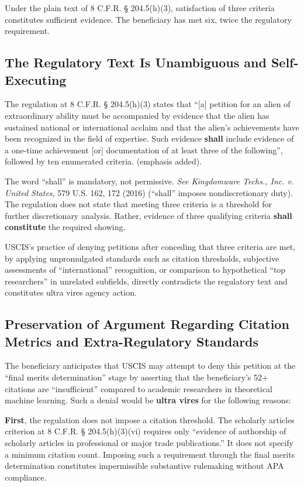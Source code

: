 Under the plain text of 8 C.F.R. § 204.5(h)(3), satisfaction of three criteria constitutes sufficient evidence. The beneficiary has met six, twice the regulatory requirement.

\subsection{The Regulatory Text Is Unambiguous and Self-Executing}

The regulation at 8 C.F.R. § 204.5(h)(3) states that ``[a] petition for an alien of extraordinary ability must be accompanied by evidence that the alien has sustained national or international acclaim and that the alien's achievements have been recognized in the field of expertise. Such evidence \textbf{shall} include evidence of a one-time achievement [or] documentation of at least three of the following'', followed by ten enumerated criteria. (emphasis added).

The word ``shall'' is mandatory, not permissive. \textit{See Kingdomware Techs., Inc. v. United States}, 579 U.S. 162, 172 (2016) (``shall'' imposes nondiscretionary duty). The regulation does not state that meeting three criteria is a threshold for further discretionary analysis. Rather, evidence of three qualifying criteria \textbf{shall constitute} the required showing.

USCIS's practice of denying petitions after conceding that three criteria are met, by applying unpromulgated standards such as citation thresholds, subjective assessments of ``international'' recognition, or comparison to hypothetical ``top researchers'' in unrelated subfields, directly contradicts the regulatory text and constitutes ultra vires agency action.

\subsection{Preservation of Argument Regarding Citation Metrics and Extra-Regulatory Standards}

The beneficiary anticipates that USCIS may attempt to deny this petition at the ``final merits determination'' stage by asserting that the beneficiary's 52+ citations are ``insufficient'' compared to academic researchers in theoretical machine learning. Such a denial would be \textbf{ultra vires} for the following reasons:

\textbf{First}, the regulation does not impose a citation threshold. The scholarly articles criterion at 8 C.F.R. § 204.5(h)(3)(vi) requires only ``evidence of authorship of scholarly articles in professional or major trade publications.'' It does not specify a minimum citation count. Imposing such a requirement through the final merits determination constitutes impermissible substantive rulemaking without APA compliance.

